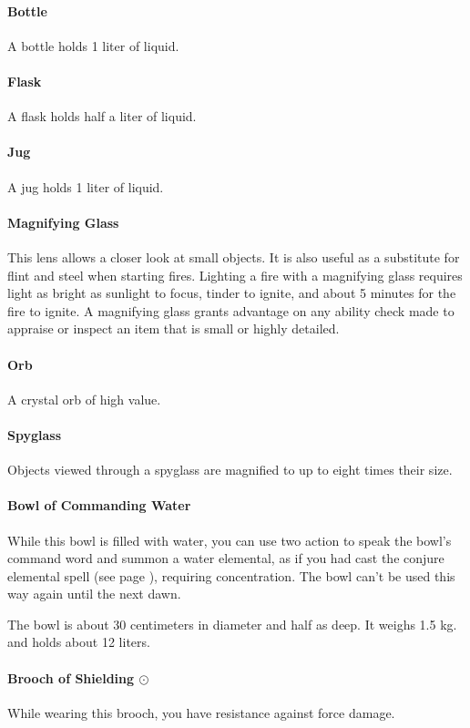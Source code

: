 \paragraph{Bottle}
    A bottle holds 1 liter of liquid.
\paragraph{Flask}
    A flask holds half a liter of liquid.
\paragraph{Jug}
    A jug holds 1 liter of liquid.
\paragraph{Magnifying Glass}
    This lens allows a closer look at small objects.
    It is also useful as a substitute for flint and steel when starting fires.
    Lighting a fire with a magnifying glass requires light as bright as sunlight to focus, tinder to ignite, and about 5 minutes for the fire to ignite.
    A magnifying glass grants advantage on any ability check made to appraise or inspect an item that is small or highly detailed.
\paragraph{Orb}
    A crystal orb of high value.
\paragraph{Spyglass}
    Objects viewed through a spyglass are magnified to up to eight times their size.
\paragraph{Bowl of Commanding Water}
    While this bowl is filled with water, you can use two action to speak the bowl's command word and summon a water elemental, as if you had cast the conjure elemental spell (see page \pageref{spell::conjureelemental}), requiring concentration.
    The bowl can't be used this way again until the next dawn.

    The bowl is about 30 centimeters in diameter and half as deep.
    It weighs 1.5 kg. and holds about 12 liters.
\paragraph{Brooch of Shielding $\odot$}
    While wearing this brooch, you have resistance against force damage.
